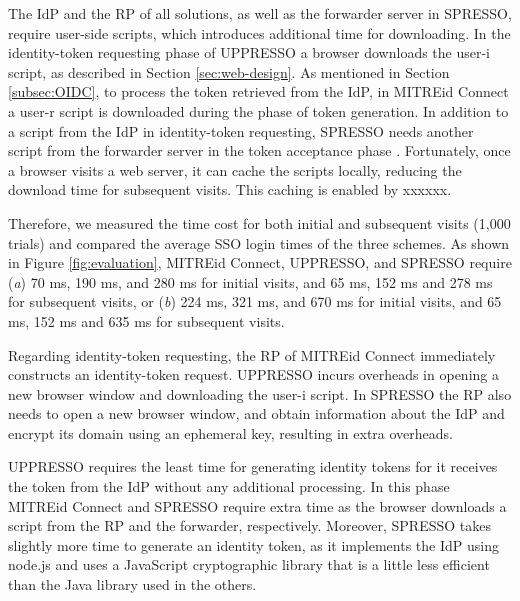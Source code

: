 The IdP and the RP of all solutions, as well as the forwarder server in SPRESSO,
     require user-side scripts, which introduces additional time for downloading. 
In the identity-token requesting phase of UPPRESSO a browser downloads the user-i script,
    as described in Section \ref{sec:web-design}.
As mentioned in Section \ref{subsec:OIDC},
 to process the token retrieved from the IdP, %
    in MITREid Connect a user-r script is downloaded during the phase of token generation.
In addition to a script from the IdP in identity-token requesting,
SPRESSO needs another script from the forwarder server in the token acceptance phase \cite{SPRESSO}.
Fortunately, once a browser visits a web server, it can cache the scripts locally, reducing the download time for subsequent visits. This caching is enabled by xxxxxx.

Therefore, we measured the time cost for both initial and subsequent visits (1,000 trials) and compared the average SSO login times of the three schemes.
As shown in Figure \ref{fig:evaluation},
MITREid Connect, UPPRESSO, and SPRESSO require (\emph{a}) 70 ms, 190 ms, and 280 ms for initial visits, and 65 ms, 152 ms and 278 ms for subsequent visits,
 or (\emph{b}) 224 ms, 321 ms, and 670 ms for initial visits, and 65 ms, 152 ms and 635 ms for subsequent visits.

Regarding identity-token requesting, %
the RP of MITREid Connect immediately constructs an identity-token request. %
UPPRESSO incurs overheads in opening a new browser window and downloading the user-i script.
%
%
In SPRESSO the RP also needs to open a new browser window, and obtain information about the IdP %
and encrypt its domain using an ephemeral key, resulting in extra overheads.

UPPRESSO requires the least time for generating identity tokens for it receives the token from the IdP without any additional processing.
In this phase MITREid Connect and SPRESSO require extra time as the browser downloads a script from the RP and the forwarder, respectively. %
Moreover, SPRESSO takes slightly more time to generate an identity token, as it implements the IdP using node.js and uses a JavaScript cryptographic library that is a little less efficient than the Java library used in the others.

